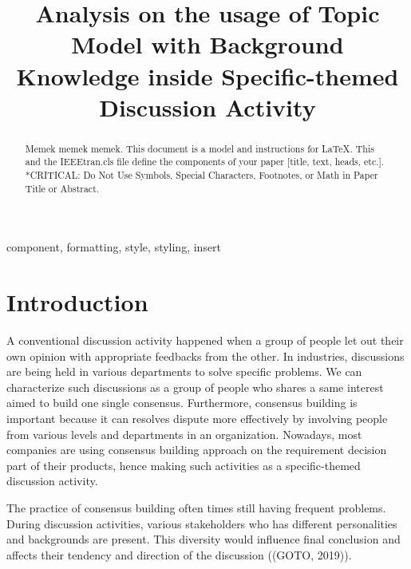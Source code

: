 \documentclass[conference]{IEEEtran}
\begin{document}
\title{Analysis on the usage of Topic Model with Background Knowledge inside Specific-themed Discussion Activity}

\author{
}

\maketitle

\begin{abstract}
Memek memek memek.
This document is a model and instructions for \LaTeX.
This and the IEEEtran.cls file define the components of your paper [title, text, heads, etc.]. *CRITICAL: Do Not Use Symbols, Special Characters, Footnotes, 
or Math in Paper Title or Abstract.
\end{abstract}

\begin{IEEEkeywords}
component, formatting, style, styling, insert
\end{IEEEkeywords}

\section{Introduction}
A conventional discussion activity happened when a group of people let out their own opinion with appropriate feedbacks from the other. In industries, discussions are being held in various departments to solve specific problems. We can characterize such discussions as a group of people who shares a same interest aimed to build one single consensus. Furthermore, consensus building is important because it can resolves dispute more effectively by involving people from various levels and departments in an organization\cite{b1}. Nowadays, most companies are using consensus building approach on the requirement decision part of their products, hence making such activities as a specific-themed discussion activity.

The practice of consensus building often times still having frequent problems. During discussion activities, various stakeholders who has different personalities and backgrounds are present. This diversity would influence final conclusion\cite{b2} and affects their tendency and direction of the discussion ((GOTO, 2019)).
 
\end{document}
